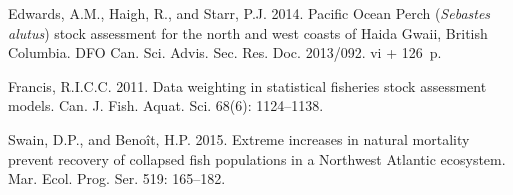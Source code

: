\documentclass[12pt]{article}\usepackage[]{graphicx}\usepackage[]{color}
\begin{document}
\noindent \vspace{-2em} \setlength{\parindent}{-0.2in} \setlength{\leftskip}{0.2in} \setlength{\parskip}{8pt}

\hypertarget{refs}{}
\begin{CSLReferences}{1}{0}
%
Edwards, A.M., Haigh, R., and Starr, P.J. 2014. Pacific {Ocean Perch} ({\emph{Sebastes alutus}}) stock assessment for the north and west coasts of {Haida Gwaii, British Columbia}. DFO Can. Sci. Advis. Sec. Res. Doc. 2013/092. vi + 126~p.

%
Francis, R.I.C.C. 2011. Data weighting in statistical fisheries stock assessment models. Can. J. Fish. Aquat. Sci. 68(6): 1124--1138.

%
Swain, D.P., and Benoît, H.P. 2015. Extreme increases in natural mortality prevent recovery of collapsed fish populations in a {N}orthwest {A}tlantic ecosystem. Mar. Ecol. Prog. Ser. 519: 165--182.

\end{CSLReferences}
\end{document}
